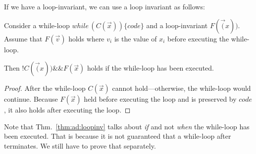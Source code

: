 If we have a loop-invariant, we can use a loop invariant as follows:
\begin{theorem}\label{thm:ad:loopinv}
Consider a while-loop $while\,(C(\vec{x}))\{code\}$ and a loop-invariant $F(\vec(x))$.\\
Assume that $F(\vec{v})$ holds where $v_i$ is the value of $x_i$ before executing the while-loop.
\medskip

Then $!C(\vec({x})) \&\& F(\vec{x})$ holds if  the while-loop has been executed.
\end{theorem}
\begin{proof}
After the while-loop $C(\vec{x})$ cannot hold---otherwise, the while-loop would continue.
Because $F(\vec{x})$ held before executing the loop and is preserved by $code$, it also holds after executing the loop.
\end{proof}

Note that Thm.~\ref{thm:ad:loopinv} talks about \emph{if} and not \emph{when} the while-loop has been executed.
That is because it is not guaranteed that a while-loop after terminates.
We still have to prove that separately.

